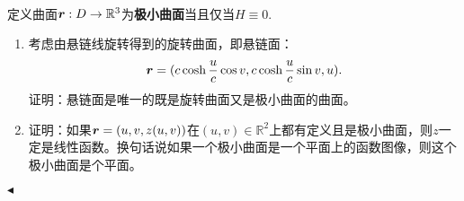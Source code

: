 \documentclass[11pt]{article}
\newenvironment{question}[2][Question]{\begin{trivlist}
\item[\hskip \labelsep {\bfseries #1}\hskip \labelsep {\bfseries #2.}]}{\hfill$\blacktriangleleft$\end{trivlist}}
\begin{document}
    \begin{question}{6 (10') (极小曲面)}~\\
    定义曲面$\vb*{r}:D\rightarrow \mathbb{R}^3$为\textbf{极小曲面}当且仅当$H\equiv0$.
    \begin{enumerate}
        \item [a (5')] 
        考虑由悬链线旋转得到的旋转曲面，即悬链面：
        \[ \vb*{r} = (c\cosh{\frac{u}{c}}\cos{v},c\cosh{\frac{u}{c}}\sin{v},u) \text{.}\]
        证明：悬链面是唯一的既是旋转曲面又是极小曲面的曲面。
        \item [b (5')] [伯恩斯坦定理]证明：如果$\vb*{r} = (u, v, z(u, v))$在$(u, v)\in\mathbb{R}^2$上都有定义且是极小曲面，则$z$一定是线性函数。换句话说如果一个极小曲面是一个平面上的函数图像，则这个极小曲面是个平面。
    \end{enumerate}
    \end{question}
\end{document}
